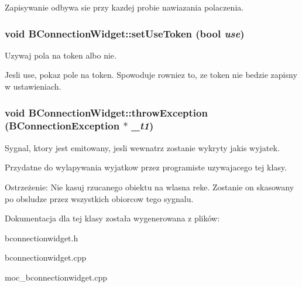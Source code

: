 Zapisywanie odbywa sie przy kazdej probie nawiazania polaczenia. \hypertarget{class_b_connection_widget_80d71ca868172dc623b9fa6c1ab938a6}{
\subsubsection[{setUseToken}]{\setlength{\rightskip}{0pt plus 5cm}void BConnectionWidget::setUseToken (bool {\em use})}}
\label{class_b_connection_widget_80d71ca868172dc623b9fa6c1ab938a6}


Uzywaj pola na token albo nie. 

Jesli use, pokaz pole na token. Spowoduje rowniez to, ze token nie bedzie zapisny w ustawieniach. \hypertarget{class_b_connection_widget_8d14da5ae492c481f88adfbcdabf47d2}{
\subsubsection[{throwException}]{\setlength{\rightskip}{0pt plus 5cm}void BConnectionWidget::throwException ({\bf BConnectionException} $\ast$ {\em \_\-t1})}}
\label{class_b_connection_widget_8d14da5ae492c481f88adfbcdabf47d2}


Sygnal, ktory jest emitowany, jesli wewnatrz zostanie wykryty jakis wyjatek. 

Przydatne do wylapywania wyjatkow przez programiste uzywajacego tej klasy.

\begin{Desc}
\item[Ostrzeżenie:]Nie kasuj rzucanego obiektu na wlasna reke. Zostanie on skasowany po obsludze przez wszystkich obiorcow tego sygnalu. \end{Desc}


Dokumentacja dla tej klasy została wygenerowana z plików:\begin{CompactItemize}
\item 
bconnectionwidget.h\item 
bconnectionwidget.cpp\item 
moc\_\-bconnectionwidget.cpp\end{CompactItemize}
